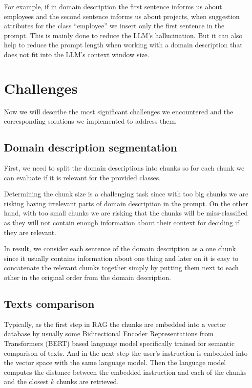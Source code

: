 For example, if in domain description the first sentence informs us about employees and the second sentence informs us about projects, when suggestion attributes for the class ``employee'' we insert only the first sentence in the prompt. This is mainly done to reduce the LLM's hallucination. But it can also help to reduce the prompt length when working with a domain description that does not fit into the LLM's context window size.



\section{Challenges}

Now we will describe the most significant challenges we encountered and the corresponding solutions we implemented to address them.

\subsection{Domain description segmentation}
First, we need to split the domain descriptions into chunks so for each chunk we can evaluate if it is relevant for the provided classes.

Determining the chunk size is a challenging task since with too big chunks we are risking having irrelevant parts of domain description in the prompt. On the other hand, with too small chunks we are risking that the chunks will be miss-classified as they will not contain enough information about their context for deciding if they are relevant.

In result, we consider each sentence of the domain description as a one chunk since it usually contains information about one thing and later on it is easy to concatenate the relevant chunks together simply by putting them next to each other in the original order from the domain description.


\subsection{Texts comparison}

Typically, as the first step in RAG the chunks are embedded into a vector database by usually some Bidirectional Encoder Representations from Transformers (BERT) based language model specifically trained for semantic comparison of texts. And in the next step the user's instruction is embedded into the vector space with the same language model. Then the language model computes the distance between the embedded instruction and each of the chunks and the closest $k$ chunks are retrieved.

